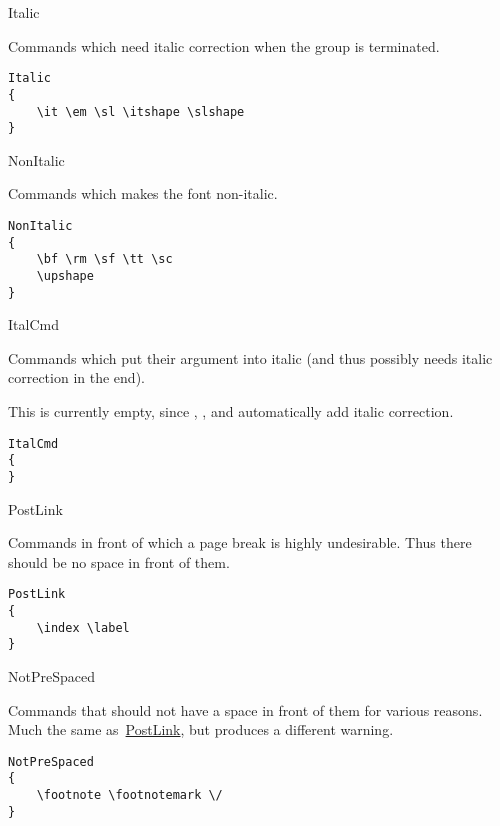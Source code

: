 \begin{chktexrclistvar}{Italic}

Commands which need italic correction when the group is terminated.

\chktexrcdefault\begin{verbatim}
Italic
{
    \it \em \sl \itshape \slshape
}
\end{verbatim}
\end{chktexrclistvar}


\begin{chktexrclistvar}{NonItalic}

Commands which makes the font non-italic.

\chktexrcdefault\begin{verbatim}
NonItalic
{
    \bf \rm \sf \tt \sc
    \upshape
}
\end{verbatim}
\end{chktexrclistvar}


\begin{chktexrclistvar}{ItalCmd}

Commands which put their argument into italic (and thus possibly
needs italic correction in the end).

This is currently empty, since \verb@\textit@, \verb@\textsl@, and \verb@\emph@
automatically add italic correction.

\chktexrcdefault\begin{verbatim}
ItalCmd
{
}
\end{verbatim}
\end{chktexrclistvar}


\begin{chktexrclistvar}{PostLink}

Commands in front of which a page break is highly undesirable.
Thus there should be no space in front of them.

\chktexrcdefault\begin{verbatim}
PostLink
{
    \index \label
}
\end{verbatim}
\end{chktexrclistvar}


\begin{chktexrclistvar}{NotPreSpaced}

Commands that should not have a space in front of them for various
reasons.  Much the same as~\hyperref[rc:PostLink]{PostLink}, but produces a different warning.

\chktexrcdefault\begin{verbatim}
NotPreSpaced
{
    \footnote \footnotemark \/
}
\end{verbatim}
\end{chktexrclistvar}


